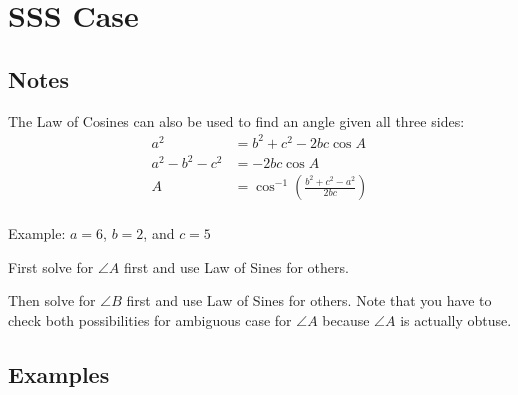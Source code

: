 \documentclass{exam}
\begin{document}
  \section{SSS Case}
  \subsection{Notes}
  The Law of Cosines can also be used to find an angle given all three sides:
  \begin{align*}
    a^2             & = b^2 + c^2 - 2bc \cos A \\
    a^2 - b^2 - c^2 & = - 2bc \cos A \\
    A               & = \cos^{-1} \left( \frac{b^2 + c^2 - a^2}{2bc} \right) \\
  \end{align*}

  Example: $a = 6$, $b = 2$, and $c = 5$

  \begin{itemize*}
    \item First solve for $\angle A$ first and use Law of Sines for others.
    \item Then solve for $\angle B$ first and use Law of Sines for others.  Note that you have to check both
      possibilities for ambiguous case for $\angle A$ because $\angle A$ is actually obtuse.
  \end{itemize*}

  \subsection{Examples}
\end{document}
